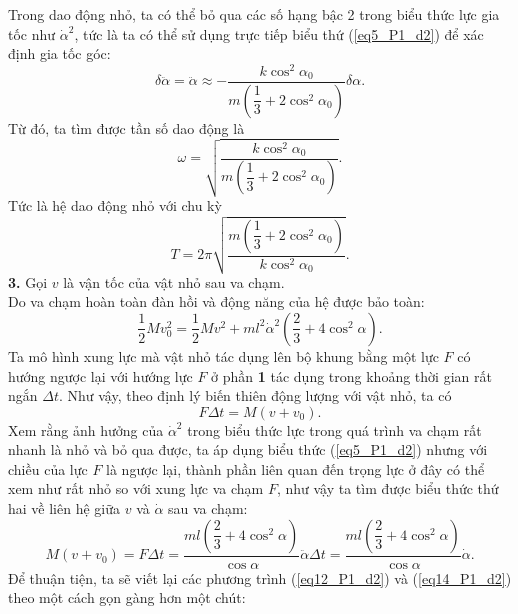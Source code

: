 Trong dao động nhỏ, ta có thể bỏ qua các số hạng bậc 2 trong biểu thức lực gia tốc như $\dot{\alpha}^2$, tức là ta có thể sử dụng trực tiếp biểu thứ (\ref{eq5_P1_d2}) để xác định gia tốc góc:
\begin{equation} \label{eq9_P1_d2}
    \delta \ddot{\alpha} = \ddot{\alpha} \approx - \dfrac{k \cos^2 \alpha_0}{m \left( \dfrac{1}{3} + 2 \cos^2 \alpha_0 \right) } \delta \alpha.
\end{equation}
Từ đó, ta tìm được tần số dao động là
\begin{equation} \label{eq10_P1_d2}
    \omega = \sqrt{ \dfrac{k \cos^2 \alpha_0}{m \left( \dfrac{1}{3} + 2 \cos^2 \alpha_0 \right) } }.
\end{equation}
Tức là hệ dao động nhỏ với chu kỳ
\begin{equation} \label{eq11_P1_d2}
    T = 2 \pi \sqrt{ \dfrac{m \left( \dfrac{1}{3} + 2 \cos^2 \alpha_0 \right)}{k \cos^2 \alpha_0} }.
\end{equation}
\noindent \textbf{3.} Gọi $v$ là vận tốc của vật nhỏ sau va chạm. \\
Do va chạm hoàn toàn đàn hồi và động năng của hệ được bảo toàn:
\begin{equation} \label{eq12_P1_d2}
    \dfrac{1}{2} M v_0^2 = \dfrac{1}{2} M v^2 + m l^2 \dot{\alpha}^2 \left( \dfrac{2}{3} + 4 \cos^2 \alpha \right).
\end{equation}
Ta mô hình xung lực mà vật nhỏ tác dụng lên bộ khung bằng một lực $F$ có hướng ngược lại với hướng lực $F$ ở phần \textbf{1} tác dụng trong khoảng thời gian rất ngắn $\Delta t$. Như vậy, theo định lý biến thiên động lượng với vật nhỏ, ta có
\begin{equation} \label{eq13_P1_d2}
    F \Delta t = M (v+v_0).
\end{equation}
Xem rằng ảnh hưởng của $\dot{\alpha}^2$ trong biểu thức lực trong quá trình va chạm rất nhanh là nhỏ và bỏ qua được, ta áp dụng biểu thức (\ref{eq5_P1_d2}) nhưng với chiều của lực $F$ là ngược lại, thành phần liên quan đến trọng lực ở đây có thể xem như rất nhỏ so với xung lực va chạm $F$, như vậy ta tìm được biểu thức thứ hai về liên hệ giữa $v$ và $\dot{\alpha}$ sau va chạm:
\begin{equation} \label{eq14_P1_d2}
    M (v+v_0) = F \Delta t = \dfrac{ ml \left( \dfrac{2}{3} + 4 \cos^2 \alpha \right) }{ \cos \alpha} \ddot{\alpha} \Delta t =  \dfrac{ ml \left( \dfrac{2}{3} + 4 \cos^2 \alpha \right) }{ \cos \alpha} \dot{\alpha}.
\end{equation}
Để thuận tiện, ta sẽ viết lại các phương trình (\ref{eq12_P1_d2}) và (\ref{eq14_P1_d2}) theo một cách gọn gàng hơn một chút:
